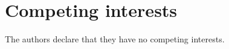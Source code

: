 \section*{Competing interests}

The authors declare that they have no competing interests.

\normalsize





%
%
%






